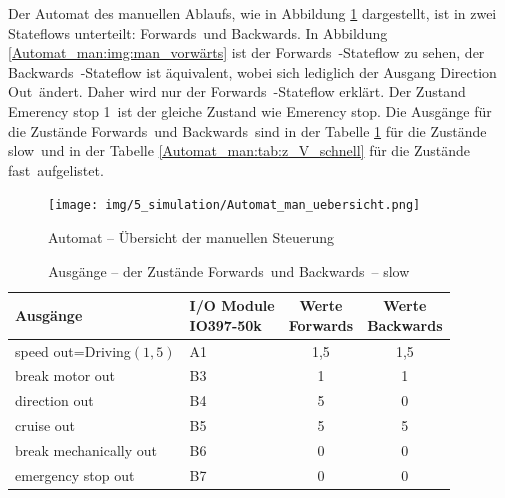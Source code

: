 Der Automat des manuellen Ablaufs, wie in Abbildung \ref{Automat_man:img:man_übersicht} dargestellt, ist in zwei Stateflows unterteilt: \frqq Forwards\flqq\ und \frqq Backwards\flqq . In Abbildung \ref{Automat_man:img:man_vorwärts} ist der \frqq Forwards\flqq\ -Stateflow zu sehen, der \frqq Backwards\flqq\ -Stateflow ist äquivalent, wobei sich lediglich der Ausgang \frqq Direction Out\flqq\ ändert. Daher wird nur der \frqq Forwards\flqq\ -Stateflow erklärt. Der Zustand \frqq Emerency stop 1\flqq\ ist der gleiche Zustand wie \frqq Emerency stop\flqq. Die Ausgänge für die Zustände \frqq Forwards\flqq\ und \frqq Backwards\flqq\ sind in der Tabelle \ref{Automat_man:tab:z_V_langsam} für die Zustände \frqq slow\flqq\ und in der Tabelle \ref{Automat_man:tab:z_V_schnell} für die Zustände \frqq fast\flqq\ aufgelistet.




\pagebreak[1]
\begin{figure}[!ht]
	\begin{center}
		\texttt{[image: img/5\_simulation/Automat\_man\_uebersicht.png]}
		\caption{Automat – Übersicht der manuellen Steuerung}
		\label{Automat_man:img:man_übersicht}
	\end{center}
\end{figure}
\pagebreak[1]


\pagebreak[1]
\begin{table}[!ht]
	\centering
	\caption{Ausgänge – der Zustände \frqq Forwards\flqq\ und \frqq Backwards\flqq\ –  \frqq slow\flqq}
	\label{Automat_man:tab:z_V_langsam}
	\begin{tabular}{llcc}
		\hline
		\textbf{Ausgänge}                             & \makecell{\textbf{I/O Module}             \\ \textbf{IO397-50k}}     & \makecell{\textbf{Werte}       \\ \textbf{\frqq Forwards\flqq}} & \makecell{\textbf{Werte}     \\ \textbf{\frqq Backwards\flqq}}  \\ \hline
		\multicolumn{1}{l|}{speed out=Driving$(1,5)$} & \multicolumn{1}{l|}{A1}       & 1,5 & 1,5 \\
		\multicolumn{1}{l|}{break motor out}          & \multicolumn{1}{l|}{B3}       & 1   & 1   \\
		\multicolumn{1}{l|}{direction out}            & \multicolumn{1}{l|}{B4}       & 5   & 0   \\
		\multicolumn{1}{l|}{cruise out}               & \multicolumn{1}{l|}{B5}       & 5   & 5   \\
		\multicolumn{1}{l|}{break mechanically out}   & \multicolumn{1}{l|}{B6}       & 0   & 0   \\
		\multicolumn{1}{l|}{emergency stop out}       & \multicolumn{1}{l|}{B7}       & 0   & 0   \\ \hline
	\end{tabular}
\end{table}
\pagebreak[1]

